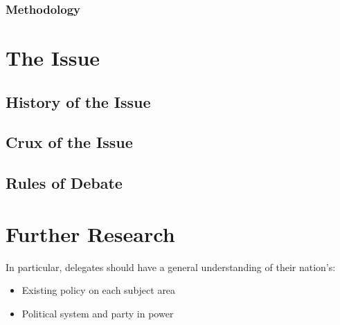 \documentclass[11pt,a4paper]{report}
\begin{document}
\subsubsection{Methodology}

\section{The Issue}
\subsection{History of the Issue}

\subsection{Crux of the Issue}

\subsection{Rules of Debate}


\section{Further Research}

In particular, delegates should have a general understanding of their nation’s:

\begin{itemize}
	\item Existing policy on each subject area
	\item Political system and party in power
\end{itemize}
\end{document}

